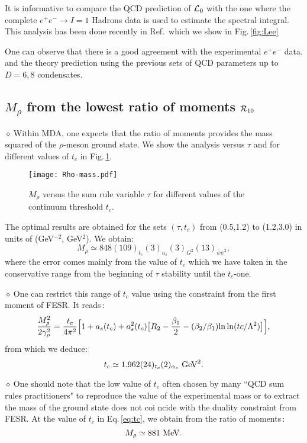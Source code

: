 \documentclass[aps,prd,groupedaddress,nofootinbib]{revtex4-1}
\def\beq{\begin{equation}}
\def\eeq{\end{equation}}
\def\d{$\diamond~$}
\begin{document}
It is informative to compare the QCD prediction of ${\cal L}_0$ with the one where the
complete $e^+e^-\to I=1$ Hadrons data is used to estimate the spectral integral. This analysis has been done recently  in Ref.\,\cite{SNe23} which we show in Fig.\,\ref{fig:Lee}

One can observe that there is a good agreement with the experimental $e^+e^-$ data. 
and the theory prediction using the previous sets of QCD parameters up to $D=6,8$ condensates.

\subsection{$M_\rho$ from the lowest ratio of moments ${\cal R}_{10}$}
\d Within MDA, one expects that the ratio of moments provides the mass squared of the 
$\rho$-meson ground state. We show the analysis versus $\tau$ and for different values of $t_c$ in Fig.\,\ref{fig:mrho}.
\begin{figure}[hbt]
\begin{center}
\texttt{[image: Rho-mass.pdf]}
\caption{\normalsize   $M_\rho$  versus the sum rule variable $\tau$ for different values of the continuum threshold $t_c$.} \label{fig:mrho}
\end{center}
\vspace*{-0.5cm}
\end{figure} 
The optimal results are obtained for the sets $(\tau,t_c)$ from (0.5,1.2) to (1.2,3.0)
in units of (GeV$^{-2}$, GeV$^2$). We obtain:
\beq
M_\rho\simeq 848(109)_{t_c}(3)_{a_s}(3)_{G^2}(13)_{\bar\psi\psi^2},
\eeq
where the error comes mainly from the value of $t_c$ which we have taken in the conservative range from the beginning of $\tau$ stability until the $t_c$-one. 

\d One can restrict this range of $t_c$ value using the constraint from the first moment of FESR. It reads\,\cite{FESR1,FESR2}:
\beq
\frac{M_\rho^2}{2\gamma_\rho^2} = \frac{t_c}{4\pi^2}\Big{[} 1+a_s(t_c)+a_s^2(t_c)\big{[}R_2-\frac{\beta_1}{2}-(\beta_2/\beta_1){\rm ln\,ln}(tc/\Lambda^2)\big{]}\Big{]},
\eeq
from which we deduce:
\beq
t_c\simeq 1.962(24)_{t_c}(2)_{\alpha_s}~{\rm GeV}^2. 
\label{eq:tc}
\eeq

\d One should note that the low value of $t_c$ often chosen by many ``QCD sum rules practitioners" to reproduce the value of the experimental mass or to extract the mass of the ground state does not coi ncide with the duality constraint from FESR.  At the value of $t_c$ in Eq.\,\ref{eq:tc}, we obtain from the ratio of moments\,:
\beq
M_{\rho}\simeq 881~{\rm MeV}.
\eeq
\end{document}
